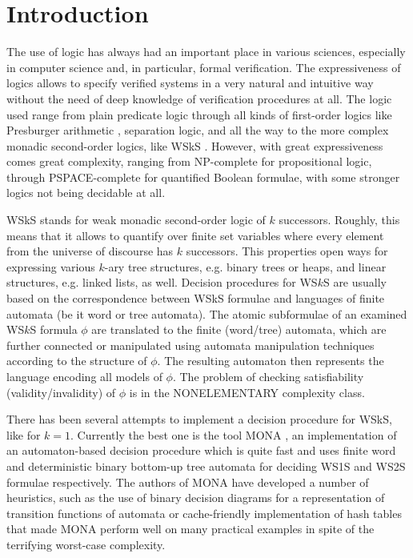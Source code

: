 \chapter{Introduction}
 
The use of logic has always had an important place in various sciences, especially in computer science and, in particular, formal verification. The expressiveness of logics allows to specify verified systems in a very natural and intuitive way without the need of deep knowledge of verification procedures at all. The logic used range from plain predicate logic through all kinds of first-order logics like Presburger arithmetic \cite{presburger}, separation logic, and all the way to the more complex monadic second-order logics, like WSkS \cite{wsks}. However, with great expressiveness comes great complexity, ranging from NP-complete for propositional logic, through PSPACE-complete for quantified Boolean formulae, with some stronger logics not being decidable at all.

WSkS stands for weak monadic second-order logic of $k$ successors. Roughly, this
means that it allows to quantify over finite set variables where every element
from the universe of discourse has $k$ successors. This properties open ways for expressing various $k$-ary tree structures, e.g. binary trees or heaps, and linear structures, e.g. linked lists, as well. Decision procedures for WS$k$S are usually based on the correspondence between WSkS formulae and languages of finite automata (be it word or tree automata). The atomic subformulae of an examined WS$k$S formula $\phi$ are translated to the finite (word/tree) automata, which are further connected or manipulated using automata manipulation techniques according to the structure of $\phi$. The resulting automaton then represents the language encoding all models of $\phi$. The problem of checking satisfiability (validity/invalidity) of $\phi$ is in the NONELEMENTARY complexity class.

There has been several attempts to implement a decision procedure for WSkS, like \cite{nfa} for $k = 1$. Currently the best one is the tool \textsc{MONA} \cite{mona}, an implementation of an automaton-based decision procedure which is quite fast and uses finite word and deterministic binary bottom-up tree automata for deciding WS1S and WS2S formulae respectively. The authors of \textsc{MONA} have developed a number of heuristics, such as the use of binary decision diagrams for a representation of transition functions of automata or cache-friendly implementation of hash tables that made \textsc{MONA} perform well on many practical examples in spite of the terrifying worst-case complexity. 

